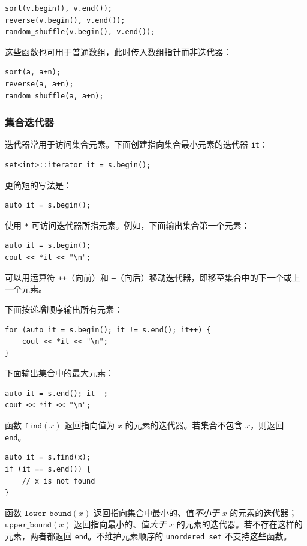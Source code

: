
\begin{lstlisting}
sort(v.begin(), v.end());
reverse(v.begin(), v.end());
random_shuffle(v.begin(), v.end());
\end{lstlisting}

这些函数也可用于普通数组，此时传入数组指针而非迭代器：

\newpage
\begin{lstlisting}
sort(a, a+n);
reverse(a, a+n);
random_shuffle(a, a+n);
\end{lstlisting}

\subsubsection{集合迭代器}

迭代器常用于访问集合元素。下面创建指向集合最小元素的迭代器 \texttt{it}：
\begin{lstlisting}
set<int>::iterator it = s.begin();
\end{lstlisting}
更简短的写法是：
\begin{lstlisting}
auto it = s.begin();
\end{lstlisting}
使用 \texttt{*} 可访问迭代器所指元素。例如，下面输出集合第一个元素：

\begin{lstlisting}
auto it = s.begin();
cout << *it << "\n";
\end{lstlisting}

可以用运算符 \texttt{++}（向前）和 \texttt{--}（向后）移动迭代器，即移至集合中的下一个或上一个元素。

下面按递增顺序输出所有元素：
\begin{lstlisting}
for (auto it = s.begin(); it != s.end(); it++) {
    cout << *it << "\n";
}
\end{lstlisting}
下面输出集合中的最大元素：
\begin{lstlisting}
auto it = s.end(); it--;
cout << *it << "\n";
\end{lstlisting}

函数 $\texttt{find}(x)$ 返回指向值为 $x$ 的元素的迭代器。若集合不包含 $x$，则返回 \texttt{end}。

\begin{lstlisting}
auto it = s.find(x);
if (it == s.end()) {
    // x is not found
}
\end{lstlisting}

函数 $\texttt{lower\_bound}(x)$ 返回指向集合中最小的、值\emph{不小于} $x$ 的元素的迭代器；$\texttt{upper\_bound}(x)$ 返回指向最小的、值\emph{大于} $x$ 的元素的迭代器。若不存在这样的元素，两者都返回 \texttt{end}。不维护元素顺序的 \texttt{unordered\_set} 不支持这些函数。

